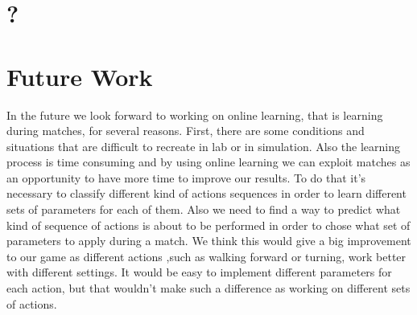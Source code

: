 \documentclass[a4paper, twocolumn]{article}
\begin{document}
\section{?}



\section{Future Work}
 
In the future we look forward to working on online learning, that is learning during matches, for several reasons. First, there are some conditions and situations that are difficult to recreate in lab or in simulation. Also the learning process is time consuming and by using online learning we can exploit matches as an opportunity to have more time to improve our results. To do that it's necessary to classify different kind of actions sequences in order to learn different sets of parameters for each of them. Also we need to find a way to predict what kind of sequence of actions is about to be performed in order to chose what set of parameters to apply during a match. We think this would give a big improvement to our game as different actions ,such as walking forward or turning, work better with different settings. It would be easy to implement different parameters for each action, but that wouldn't make such a difference as working on different sets of actions. 



\end{document}
